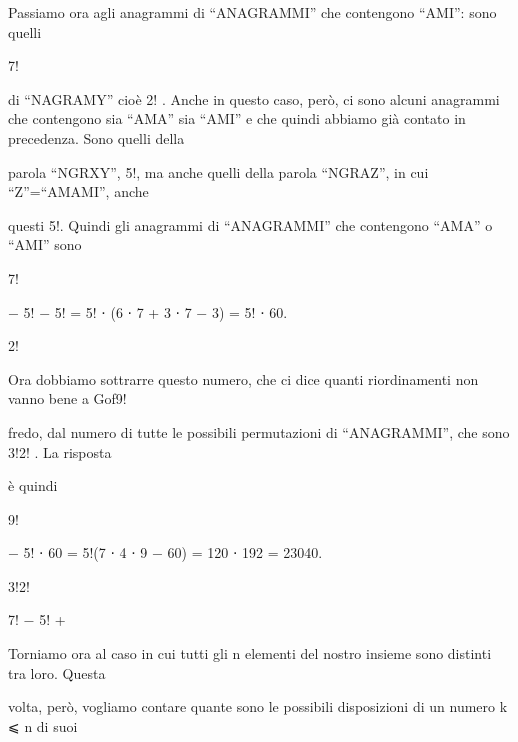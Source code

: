 \documentclass[a4paper,portrait,12pt]{article}
\begin{document}
\begin{flushleft}
Passiamo ora agli anagrammi di ``ANAGRAMMI'' che contengono ``AMI'': sono quelli
\end{flushleft}


7!


\begin{flushleft}
di ``NAGRAMY'' cio\`{e} 2! . Anche in questo caso, per\`{o}, ci sono alcuni anagrammi che contengono sia ``AMA'' sia ``AMI'' e che quindi abbiamo gi\`{a} contato in precedenza. Sono quelli della
\end{flushleft}


\begin{flushleft}
parola ``NGRXY'', 5!, ma anche quelli della parola ``NGRAZ'', in cui ``Z''=``AMAMI'', anche
\end{flushleft}


\begin{flushleft}
questi 5!. Quindi gli anagrammi di ``ANAGRAMMI'' che contengono ``AMA'' o ``AMI'' sono
\end{flushleft}


7!


$-$ 5! $-$ 5! = 5! ⋅ (6 ⋅ 7 + 3 ⋅ 7 $-$ 3) = 5! ⋅ 60.


2!


\begin{flushleft}
Ora dobbiamo sottrarre questo numero, che ci dice quanti riordinamenti non vanno bene a Gof9!
\end{flushleft}


\begin{flushleft}
fredo, dal numero di tutte le possibili permutazioni di ``ANAGRAMMI'', che sono 3!2! . La risposta
\end{flushleft}


\begin{flushleft}
\`{e} quindi
\end{flushleft}


9!


$-$ 5! ⋅ 60 = 5!(7 ⋅ 4 ⋅ 9 $-$ 60) = 120 ⋅ 192 = 23040.


3!2!


7! $-$ 5! +





\begin{flushleft}
Torniamo ora al caso in cui tutti gli n elementi del nostro insieme sono distinti tra loro. Questa
\end{flushleft}


\begin{flushleft}
volta, per\`{o}, vogliamo contare quante sono le possibili disposizioni di un numero k ⩽ n di suoi
\end{flushleft}
\end{document}
